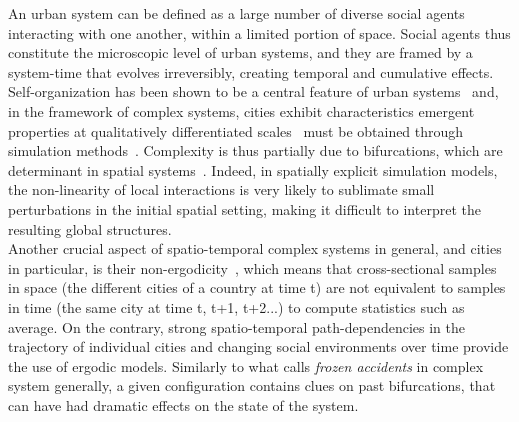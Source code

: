 \documentclass[Royal,sageh,times]{sagej}
\begin{document}
An urban system can be defined as a large number of diverse social agents interacting with one another, within a limited portion of space. Social agents thus constitute the microscopic level of urban systems, and they are framed by a system-time that evolves irreversibly, creating temporal and cumulative effects. Self-organization has been shown to be a central feature of urban systems~\citep{AllenSanglier1981,saint1989villes, Portugali2000} and, in the framework of complex systems, cities exhibit characteristics  emergent properties at qualitatively differentiated scales~\citep{pumain2006hierarchy, AzizAlaouiBertelle2009} must be obtained through simulation methods~\citep{Wu2002, Batty2007}. Complexity is thus partially due to bifurcations, which are determinant in spatial systems~\citep{Wilson1981, Wilson2002}. Indeed, in spatially explicit simulation models, the non-linearity of local interactions is very likely to sublimate small perturbations in the initial spatial setting, making it difficult to interpret the resulting global structures. \\
Another crucial aspect of spatio-temporal complex systems in general, and cities in particular, is their non-ergodicity~\citep{pumain2012urban}, which means that cross-sectional samples in space (the different cities of a country at time t) are not equivalent to samples in time (the same city at time t, t+1, t+2...) to compute statistics such as average. On the contrary, strong spatio-temporal path-dependencies in the trajectory of individual cities and changing social environments over time provide the use of ergodic models. Similarly to what \citet{gell1995quark} calls \emph{frozen accidents} in complex system generally, a given configuration contains clues on past bifurcations, that can have had dramatic effects on the state of the system. \\
\end{document}

